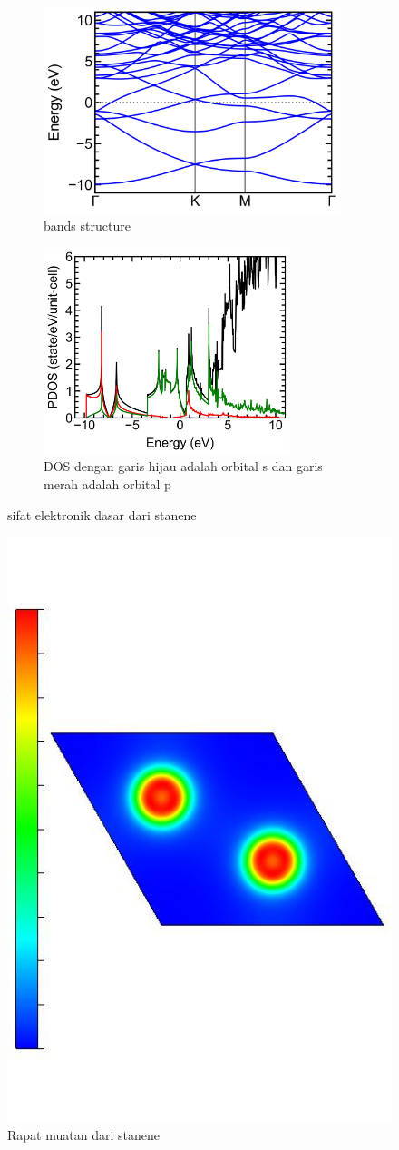 \begin{figure}[h]

\begin{subfigure}{0.5\textwidth}
\includegraphics[width=0.9\linewidth, height=6cm]{gambar/plot_sn_bands.jpg} 
\caption{bands structure}
\label{fig:subim1}
\end{subfigure}
\begin{subfigure}{0.5\textwidth}
\includegraphics[width=0.9\linewidth, height=6cm]{gambar/graph_sn_pdos.jpg}
\caption{DOS dengan garis hijau adalah orbital s dan garis merah adalah orbital p}
\label{fig:subim2}
\end{subfigure}

\caption{sifat elektronik dasar dari stanene}
\label{fig:dos dan bands sn}
\end{figure}

\begin{figure}[h]
\centering
\includegraphics[width=0.5\linewidth]{gambar/sn_rho.jpg}
\caption{Rapat muatan dari stanene}
\label{fig:charge density}
\end{figure}

